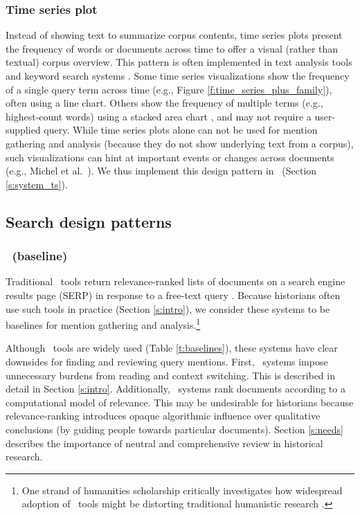 

\subsubsection{\textbf{Time series plot}}\label{s:time_series_family}

Instead of showing text to summarize corpus contents, time series plots present the frequency of words or documents across time to offer a visual (rather than textual) corpus overview. 
This pattern is often implemented in text analysis tools \cite{voyant,twitinfo,diamonds,featurelens} and keyword search systems \cite{expedition, TimeExplorer, newspapers.com}.
Some time series visualizations \cite{Michel176, histdiv, TimeExplorer} show the frequency of a single query term across time (e.g., Figure \ref{f:time_series_plus_family}), often using a line chart. 
Others show the frequency of multiple terms (e.g., highest-count words) using a stacked area chart \cite{ThemeRiver,sotu}, and may not require a user-supplied query. 
While time series plots alone can not be used for mention gathering and analysis (because they do not show underlying text from a corpus), 
such visualizations can hint at important events or changes across documents (e.g., Michel et al.\ \cite{Michel176}).
We thus implement this design pattern in \ours~(Section \ref{s:system_ts}).

\subsection{Search design patterns}\label{s:related_work_search}

\subsubsection{\BaselongnameCap~(baseline)}\label{s:baseline}

Traditional \Baselongname~tools return relevance-ranked lists of documents on a search engine results page (SERP) in response to a free-text query \cite{irbook}.
Because historians often use such tools in practice (Section \ref{s:intro}),
we consider these systems to be baselines for mention gathering and analysis.\footnote{
One strand of humanities scholarship critically investigates how widespread adoption of \Baselongname~tools might be distorting traditional humanistic research \cite{Putnam,FrancesMaule,Underwood}.
}

Although \Baselongname~tools are widely used (Table \ref{t:baselines}), these systems have clear downsides for finding and reviewing query mentions.
First, \Baselongname~systems impose unnecessary burdens from reading and context switching. This is  described in detail in Section \ref{s:intro}. 
Additionally, \Baselongname~systems rank documents according to a computational model of relevance.
This may be undesirable for historians because relevance-ranking introduces opaque algorithmic influence over qualitative conclusions (by guiding people towards particular documents).
Section \ref{s:needs} describes the importance of neutral and comprehensive review in historical research.

